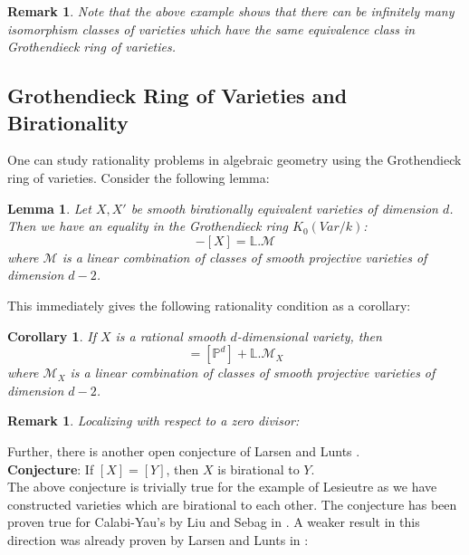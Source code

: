 \documentclass[a4, 11pt]{amsart}
\newtheorem{lemma}[theorem]{\sf Lemma}
\newtheorem{corollary}[theorem]{\sf Corollary}
\newtheorem{remark}[theorem]{\sf Remark}
\def \P{\mathbb P}
\def \L{\mathbb L}
\begin{document}
\begin{remark}
    Note that the above example shows that there can be infinitely many isomorphism classes of varieties which have the same equivalence class in Grothendieck ring of varieties.
\end{remark}

\subsection{Grothendieck Ring of Varieties and Birationality}

One can study rationality problems in algebraic geometry using the Grothendieck ring of varieties. Consider the following lemma:
\begin{lemma}\cite[Lemma 2.1]{SG}
Let $X, X'$ be smooth birationally equivalent varieties of dimension $d$. Then we have an equality in the Grothendieck ring $K_0(Var/k)$: 
\begin{equation*}
    [X'] -[X] = \L .\mathcal{M}
\end{equation*}
where $\mathcal{M}$ is a linear combination of classes of smooth projective varieties of
dimension $d-2$.    
\end{lemma}
This immediately gives the following rationality condition as a corollary:
\begin{corollary}
    If $X$ is a rational smooth $d$-dimensional variety, then
\begin{equation}
    [X] = [\P^d] + \L.\mathcal{M}_X
\end{equation}
where $\mathcal{M}_X$ is a linear combination of classes of smooth projective varieties of dimension $d - 2$.
\end{corollary}

\begin{remark}
    Localizing with respect to a zero divisor: 
\end{remark}

Further, there is another open conjecture of Larsen and Lunts \cite{LL}.\\


\textbf{Conjecture}: If $[X]=[Y]$, then $X$ is birational to $Y$.\\

The above conjecture is trivially true for the example of Lesieutre as we have constructed varieties which are birational to each other. The conjecture has been proven true for Calabi-Yau's by Liu and Sebag in \cite[Corollary 1]{LS}. A weaker result in this direction was already proven  by Larsen and Lunts in \cite{LL}:
\end{document}
